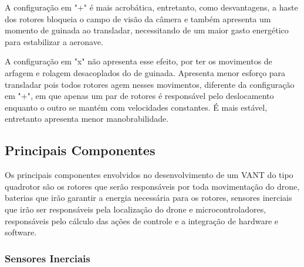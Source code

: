A configuração em "+" é mais acrobática, entretanto, como desvantagens, a haste dos rotores bloqueia o campo de visão da câmera e também apresenta um momento de guinada ao transladar, necessitando de um maior gasto energético para estabilizar a aeronave.

A configuração em "x" não apresenta esse efeito, por ter os movimentos de arfagem e rolagem desacoplados do de guinada. Apresenta menor esforço para transladar pois todos rotores agem nesses movimentos, diferente da configuração em "+", em que apenas um par de rotores é responsável pelo deslocamento enquanto o outro se mantém com velocidades constantes. É mais estável, entretanto apresenta menor manobrabilidade. \cite{NorouziGhazbi2016}


\subsection{Principais Componentes}

Os principais componentes envolvidos no desenvolvimento de um VANT do tipo quadrotor são os rotores que serão responsáveis por toda movimentação do drone, baterias que irão garantir a energia necessária para os rotores, sensores inerciais que irão ser responsáveis pela localização do drone e microcontroladores, responsáveis pelo cálculo das ações de controle e a integração de hardware e software.

\subsubsection{Sensores Inerciais}

